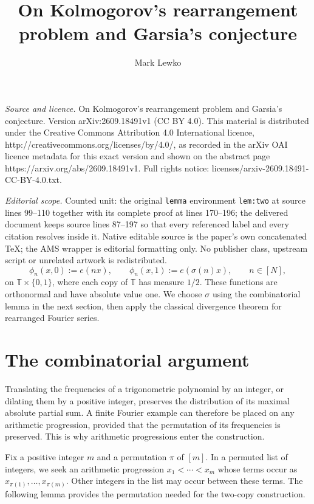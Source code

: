 \documentclass[10pt,a4paper]{amsart}
\numberwithin{equation}{section}
\newcommand{\T}{\mathbb T}
\begin{document}
\title[On Kolmogorov's rearrangement problem and Garsia's conjectur]{On Kolmogorov's rearrangement problem and Garsia's conjecture}
\author{Mark Lewko}
\date{}
\maketitle
\noindent\emph{Source and licence.} On Kolmogorov's rearrangement problem and Garsia's conjecture. Version arXiv:2609.18491v1 (CC BY 4.0). This material is distributed under the Creative Commons Attribution 4.0 International licence, http://creativecommons.org/licenses/by/4.0/, as recorded in the arXiv OAI licence metadata for this exact version and shown on the abstract page https://arxiv.org/abs/2609.18491v1. Full rights notice: licenses/arxiv-2609.18491-CC-BY-4.0.txt.\par\smallskip
\noindent\textit{Editorial scope.} Counted unit: the original \texttt{lemma} environment \texttt{lem:two} at source lines 99--110 together with its complete proof at lines 170--196; the delivered document keeps source lines 87--197 so that every referenced label and every citation resolves inside it. Native editable source is the paper's own concatenated TeX; the AMS wrapper is editorial formatting only. No publisher class, upstream script or unrelated artwork is redistributed.
\begin{equation}\label{eq:construction}
 \phi_n(x,0):=e(nx),\qquad
 \phi_n(x,1):=e(\sigma(n)x),\qquad n\in[N],
\end{equation}
on $\T\times\{0,1\}$, where each copy of $\T$ has measure $1/2$. These functions are orthonormal and have absolute value one. We choose $\sigma$ using the combinatorial lemma in the next section, then apply the classical divergence theorem for rearranged Fourier series.

\section{The combinatorial argument}

Translating the frequencies of a trigonometric polynomial by an integer, or dilating them by a positive integer, preserves the distribution of its maximal absolute partial sum. A finite Fourier example can therefore be placed on any arithmetic progression, provided that the permutation of its frequencies is preserved. This is why arithmetic progressions enter the construction.

Fix a positive integer $m$ and a permutation $\pi$ of $[m]$. In a permuted list of integers, we seek an arithmetic progression $x_1<\cdots<x_m$ whose terms occur as $x_{\pi(1)},\ldots,x_{\pi(m)}$. Other integers in the list may occur between these terms. The following lemma provides the permutation needed for the two-copy construction.
\end{document}
